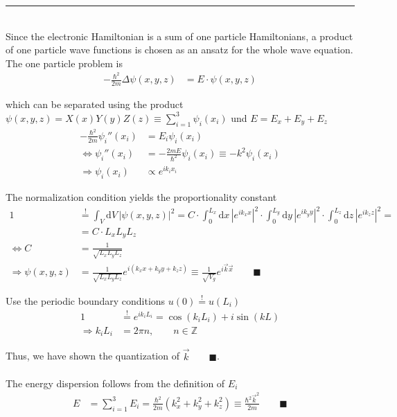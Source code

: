 \documentclass{article}
\newcommand{\diff}{\mathrm{d}}
\begin{document}
{\color{violet}
\hrule
	\\
	Since the electronic Hamiltonian is a sum of one particle Hamiltonians, a product of one particle wave functions is chosen as an ansatz for the whole wave equation. The one particle problem is
		\begin{align*}
			-\frac{\hbar^2}{2m}\Delta \psi(x,y,z) &= E \cdot \psi(x,y,z)
		\end{align*}
	
	which can be separated using the product $\psi(x,y,z) = X(x) Y(y) Z(z) \equiv \sum_{i=1}^3\psi_i(x_i)$ und $E = E_x + E_y + E_z$
		\begin{align*}
			-\frac{\hbar^2}{2m}\psi_i''(x_i) &= E_i \psi_i(x_i) \\
			\Leftrightarrow \psi_i''(x_i) &= -\frac{2mE}{\hbar^2} \psi_i(x_i) \equiv -k^2 \psi_i(x_i) \\
			\Rightarrow \psi_i(x_i) &\propto e^{ik_i x_i}
		\end{align*}
	
	The normalization condition yields the proportionality constant
		\begin{align*}
			1 &\stackrel{!}{=} \int_V \diff V \, |\psi(x,y,z)|^2 = C \cdot \int_0^{L_x} \diff x \, |e^{ik_x x}|^2 \cdot \int_0^{L_y} \diff y \, |e^{ik_y y}|^2 \cdot \int_0^{L_z} \diff z \, |e^{ik_z z}|^2 = \\
			&= C \cdot L_x L_y L_z \\
			\Leftrightarrow C &= \frac{1}{\sqrt{ L_x L_y L_z}} \\
			\Rightarrow \psi(x,y,z) &= \frac{1}{\sqrt{L_xL_yL_z}} e^{i(k_x x + k_y y + k_z z)} \equiv \frac{1}{\sqrt{V_g}} e^{i\vec{k}\vec{x}} \qquad \blacksquare
		\end{align*}

	Use the periodic boundary conditions $u(0)\stackrel{!}{=}u(L_i)$
		\begin{align*}
			1 &\stackrel{!}{=} e^{ik_iL_i} = \cos(k_iL_i) + i\sin(kL) \\
			\Rightarrow k_i L_i &= 2\pi n, \qquad n\in\mathbb{Z}
		\end{align*}

	Thus, we have shown the quantization of $\vec{k} \qquad \blacksquare$.\\
	\\
	The energy dispersion follows from the definition of $E_i$
		\begin{align*}
			E &= \sum_{i=1}^3 E_i = \frac{\hbar^2}{2m}(k_x^2 + k_y^2 + k_z^2) \equiv \frac{\hbar^2 \vec{k}^2}{2m} \qquad \blacksquare
		\end{align*}
	
}
\end{document}
